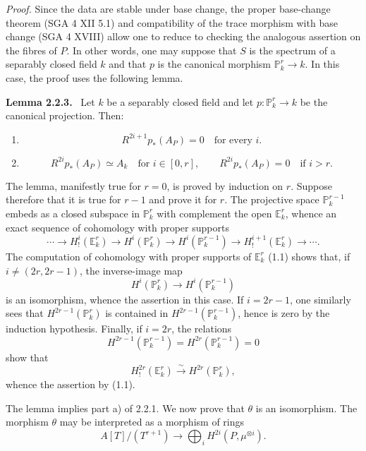 \documentclass[11pt]{article}
\newenvironment{statement}[1]{\par\medskip\noindent\textbf{#1.}\ }{\par\medskip}
\begin{document}
\emph{Proof.} Since the data are stable under base change, the proper base-change theorem (SGA 4 XII 5.1) and compatibility of the trace morphism with base change (SGA 4 XVIII) allow one to reduce to checking the analogous assertion on the fibres of $P$. In other words, one may suppose that $S$ is the spectrum of a separably closed field $k$ and that $p$ is the canonical morphism $\mathbb P^r_k\to k$. In this case, the proof uses the following lemma.

\begin{statement}{Lemma 2.2.3}
Let $k$ be a separably closed field and let $p:\mathbb P_k^r\to k$ be the canonical projection. Then:
\begin{enumerate}[label=\alph*)]
\item
\[
R^{2i+1}p_*(A_P)=0\quad\text{for every }i.
\]
\item
\[
R^{2i}p_*(A_P)\simeq A_k\quad\text{for }i\in[0,r],
\qquad
R^{2i}p_*(A_P)=0\quad\text{if }i>r.
\]
\end{enumerate}
\end{statement}

The lemma, manifestly true for $r=0$, is proved by induction on $r$. Suppose therefore that it is true for $r-1$ and prove it for $r$. The projective space $\mathbb P_k^{r-1}$ embeds as a closed subspace in $\mathbb P_k^r$ with complement the open $\mathbb E_k^r$, whence an exact sequence of cohomology with proper supports
\[
\cdots\longrightarrow H_!^i(\mathbb E_k^r)\longrightarrow H^i(\mathbb P_k^r)
\longrightarrow H^i(\mathbb P_k^{r-1})\longrightarrow H_!^{i+1}(\mathbb E_k^r)\longrightarrow\cdots.
\]
The computation of cohomology with proper supports of $\mathbb E_k^r$ (1.1) shows that, if $i\ne(2r,2r-1)$, the inverse-image map
\[
H^i(\mathbb P_k^r)\longrightarrow H^i(\mathbb P_k^{r-1})
\]
is an isomorphism, whence the assertion in this case. If $i=2r-1$, one similarly sees that $H^{2r-1}(\mathbb P_k^r)$ is contained in $H^{2r-1}(\mathbb P_k^{r-1})$, hence is zero by the induction hypothesis. Finally, if $i=2r$, the relations
\[
H^{2r-1}(\mathbb P_k^{r-1})=H^{2r}(\mathbb P_k^{r-1})=0
\]
show that
\[
H_!^{2r}(\mathbb E_k^r)\xrightarrow{\sim}H^{2r}(\mathbb P_k^r),
\]
whence the assertion by (1.1).

The lemma implies part a) of 2.2.1. We now prove that $\theta$ is an isomorphism. The morphism $\theta$ may be interpreted as a morphism of rings
\[
A[T]/(T^{r+1})\longrightarrow\bigoplus_i H^{2i}(P,\mu^{\otimes i}).
\]
\end{document}
